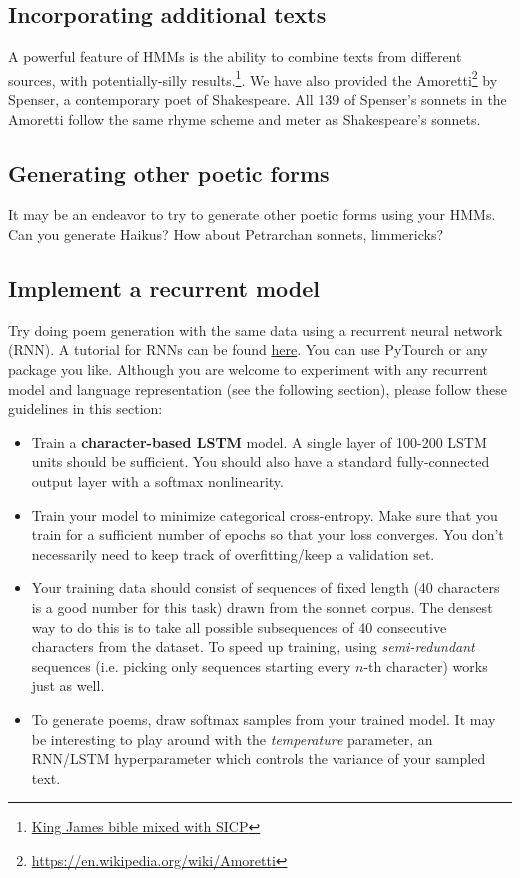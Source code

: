 \subsection{Incorporating additional texts}
A powerful feature of HMMs is the ability to combine texts from different sources, with potentially-silly results.\footnote{\href{http://kingjamesprogramming.tumblr.com/}{King James bible mixed with SICP}}. We have also provided the Amoretti\footnote{\url{https://en.wikipedia.org/wiki/Amoretti}} by Spenser, a contemporary poet of Shakespeare. All 139 of Spenser's sonnets in the Amoretti follow the same rhyme scheme and meter as Shakespeare's sonnets.

\subsection{Generating other poetic forms}
It may be an endeavor to try to generate other poetic forms using your HMMs. Can you generate Haikus? How about Petrarchan sonnets, limmericks?

\subsection{Implement a recurrent model}
Try doing poem generation with the same data using a recurrent neural network (RNN). A tutorial for RNNs can be found \href{https://pytorch.org/tutorials/intermediate/char_rnn_generation_tutorial.html}{here}. You can use PyTourch or any package you like. Although you are welcome to experiment with any recurrent model and language representation (see the following section), please follow these guidelines in this section:

\begin{itemize}
\item Train a \textbf{character-based LSTM} model. A single layer of 100-200 LSTM units should be sufficient. You should also have a standard fully-connected output layer with a softmax nonlinearity.

\item Train your model to minimize categorical cross-entropy. Make sure that you train for a sufficient number of epochs so that your loss converges. You don't necessarily need to keep track of overfitting/keep a validation set.

\item Your training data should consist of sequences of fixed length (40 characters is a good number for this task) drawn from the sonnet corpus. The densest way to do this is to take all possible subsequences of 40 consecutive characters from the dataset. To speed up training, using \emph{semi-redundant} sequences (i.e. picking only sequences starting every $n$-th character) works just as well.

\item To generate poems, draw softmax samples from your trained model. It may be interesting to play around with the \emph{temperature} parameter, an RNN/LSTM hyperparameter which controls the variance of your sampled text.
\end{itemize}


